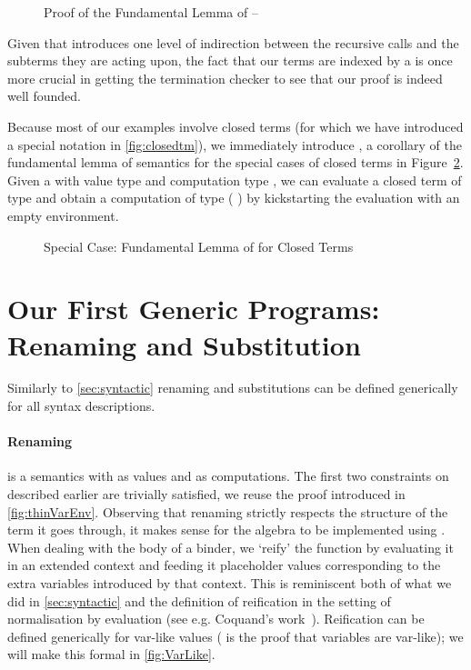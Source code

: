 \begin{figure}[h]
\caption{Proof of the Fundamental Lemma of  -- \label{fig:genbody}}
\end{figure}

Given that  introduces one level of indirection between the recursive
calls and the subterms they are acting upon, the fact that our terms are indexed
by a  is once more crucial in getting the termination checker to see
that our proof is indeed well founded.

Because most of our examples involve closed terms (for which we have
introduced a special notation in \cref{fig:closedtm}), we immediately
introduce , a corollary of the fundamental lemma of semantics
for the special cases of closed terms in Figure~\ref{fig:closedsem}.
Given a  with value type  and computation type ,
we can evaluate a closed term of type  and obtain a computation of
type {(  \AIC{[]})} by kickstarting the evaluation with an
empty environment.

\begin{figure}[h]
\caption{Special Case: Fundamental Lemma of  for Closed Terms\label{fig:closedsem}}
\end{figure}

\section{Our First Generic Programs: Renaming and Substitution}
\label{section:renandsub}

Similarly to \cref{sec:syntactic} renaming and substitutions can
be defined generically for all syntax descriptions.

\paragraph{Renaming} is a semantics with  as values and 
as computations. The first two constraints on  described earlier
are trivially satisfied, we reuse the proof 
introduced in \cref{fig:thinVarEnv}.
%
Observing that renaming strictly respects the structure of the term it goes
through, it makes sense for the algebra to be implemented using .
When dealing with the body of a binder, we `reify' the  function
by evaluating it in an extended context and feeding it placeholder values
corresponding to the extra variables introduced by that context. This is
reminiscent both of what we did in \cref{sec:syntactic} and the definition
of reification in the setting of normalisation by evaluation (see e.g.
Coquand's work~\citeyear{coquand2002formalised}). Reification can be defined
generically for var-like values ( is the proof that
variables are var-like); we will make this formal in \cref{fig:VarLike}.

